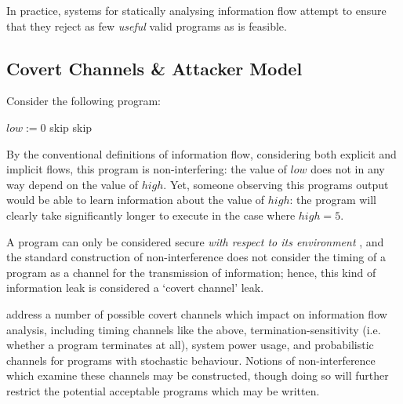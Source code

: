 %


In practice, systems for statically analysing information flow attempt to ensure that they reject as few \textit{useful} valid programs as is feasible.

\subsection{Covert Channels \& Attacker Model}

Consider the following program:

\begin{algorithmic}
	\State $ low := 0 $
			\State skip
		\EndFor
	\Else
		\State skip
	\EndIf
\end{algorithmic}

By the conventional definitions of information flow, considering both explicit and implicit flows, this program is non-interfering: the value of $ low $ does not in any way depend on the value of $ high $. Yet, someone observing this programs output would be able to learn information about the value of $ high $: the program will clearly take significantly longer to execute in the case where $ high = 5 $.

A program can only be considered secure \textit{with respect to its environment} \cite{sabelfeld2003if}, and the standard construction of non-interference does not consider the timing of a program as a channel for the transmission of information; hence, this kind of information leak is considered a `covert channel' leak.

\citeauthor{sabelfeld2003if} \cite{sabelfeld2003if} address a number of possible covert channels which impact on information flow analysis, including timing channels like the above, termination-sensitivity (i.e. whether a program terminates at all), system power usage, and probabilistic channels for programs with stochastic behaviour. Notions of non-interference which examine these channels may be constructed, though doing so will further restrict the potential acceptable programs which may be written.

